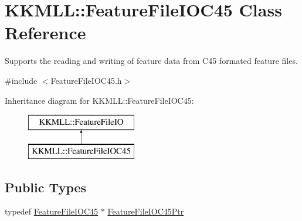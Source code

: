 \hypertarget{class_k_k_m_l_l_1_1_feature_file_i_o_c45}{}\section{K\+K\+M\+LL\+:\+:Feature\+File\+I\+O\+C45 Class Reference}
\label{class_k_k_m_l_l_1_1_feature_file_i_o_c45}


Supports the reading and writing of feature data from C45 formated feature files.  




{\ttfamily \#include $<$Feature\+File\+I\+O\+C45.\+h$>$}

Inheritance diagram for K\+K\+M\+LL\+:\+:Feature\+File\+I\+O\+C45\+:\begin{figure}[H]
\begin{center}
\leavevmode
\includegraphics[height=2.000000cm]{class_k_k_m_l_l_1_1_feature_file_i_o_c45}
\end{center}
\end{figure}
\subsection*{Public Types}
\begin{DoxyCompactItemize}
\item 
typedef \hyperlink{class_k_k_m_l_l_1_1_feature_file_i_o_c45}{Feature\+File\+I\+O\+C45} $\ast$ \hyperlink{class_k_k_m_l_l_1_1_feature_file_i_o_c45_ae0cc1ea15fc10f1a030fcbbf10a08af8}{Feature\+File\+I\+O\+C45\+Ptr}
\end{DoxyCompactItemize}
